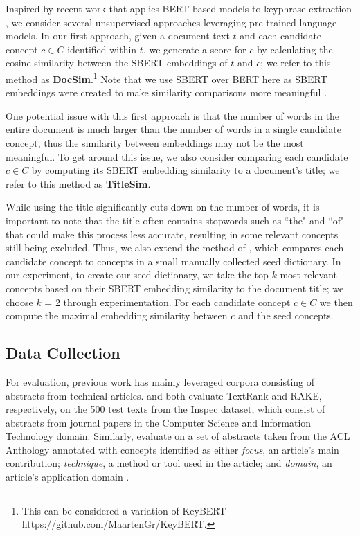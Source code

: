 \documentclass[thesis.tex]{subfiles}
\begin{document}
Inspired by recent work that applies BERT-based models to keyphrase extraction \citep{sharma2019self}, we consider several unsupervised approaches leveraging pre-trained language models. In our first approach, given a document text $t$ and each candidate concept $c \in C$ identified within $t$, we generate a score for $c$ by calculating the cosine similarity between the SBERT embeddings of $t$ and $c$; we refer to this method as \textbf{DocSim}.\footnote{This can be considered a variation of KeyBERT https://github.com/MaartenGr/KeyBERT.} Note that we use SBERT over BERT here as SBERT embeddings were created to make similarity comparisons more meaningful \citep{reimers2019sentence}.

One potential issue with this first approach is that the number of words in the entire document is much larger than the number of words in a single candidate concept, thus the similarity between embeddings may not be the most meaningful. To get around this issue, we also consider comparing each candidate $c \in C$ by computing its SBERT embedding similarity to a document's title; we refer to this method as \textbf{TitleSim}.

While using the title significantly cuts down on the number of words, it is important to note that the title often contains stopwords such as ``the" and ``of" that could make this process less accurate, resulting in some relevant concepts still being excluded. Thus, we also extend the method of \cite{tsai2013concept}, which compares each candidate concept to concepts in a small manually collected seed dictionary. In our experiment, to create our seed dictionary, we take the top-$k$ most relevant concepts based on their SBERT embedding similarity to the document title; we choose $k$ = 2 through experimentation. For each candidate concept $c \in C$ we then compute the maximal embedding similarity between $c$ and the seed concepts.

\subsection{Data Collection}

For evaluation, previous work has mainly leveraged corpora consisting of abstracts from technical articles. \cite{mihalcea2004textrank} and \cite{rose2010automatic} both evaluate TextRank and RAKE, respectively, on the 500 test texts from the Inspec dataset, which consist of abstracts from journal papers in the Computer Science and Information Technology domain. Similarly, \cite{tsai2013concept} evaluate on a set of abstracts taken from the ACL Anthology annotated with concepts identified as either \textit{focus}, an article's main contribution; \textit{technique}, a method or tool used in the article; and \textit{domain}, an article's application domain \citep{gupta2011analyzing}.
\end{document}
